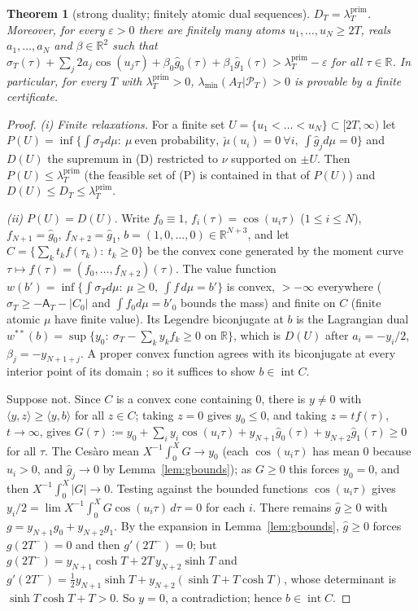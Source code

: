 \documentclass[11pt]{amsart}
\newtheorem{theorem}{Theorem}[section]
\theoremstyle{definition}
\theoremstyle{remark}
\newcommand{\R}{\mathbb R}
\newcommand{\PT}{\mathcal P_T}
\newcommand{\lamP}{\lambda^{\mathrm{prim}}_T}
\newcommand{\lamA}{\lambda_{\min}(A_T|\PT)}
\newcommand{\sT}{\sigma_T}
\newcommand{\gh}[1]{\widehat g_{#1}}
\newcommand{\Aconst}{\mathsf A_T}
\begin{document}
\begin{theorem}[strong duality; finitely atomic dual sequences]\label{thm:D1}
$D_T=\lamP$. Moreover, for every $\varepsilon>0$ there are finitely many atoms
$u_1,\dots,u_N\ge2T$, reals $a_1,\dots,a_N$ and $\beta\in\R^2$ such that
$\sT(\tau)+\sum_j2a_j\cos(u_j\tau)+\beta_0\gh0(\tau)+\beta_1\gh1(\tau)>\lamP-\varepsilon$ for all $\tau\in\R$.
In particular, for every $T$ with $\lamP>0$, $\lamA>0$ is provable by a finite certificate.
\end{theorem}
\begin{proof}
\emph{(i) Finite relaxations.} For a finite set $U=\{u_1<\dots<u_N\}\subset[2T,\infty)$ let
$P(U)=\inf\{\int\sT d\mu:\ \mu\ \text{even probability},\ \check\mu(u_i)=0\ \forall i,\ \int\gh j d\mu=0\}$
and $D(U)$ the supremum in (D) restricted to $\nu$ supported on $\pm U$. Then $P(U)\le\lamP$
(the feasible set of (P) is contained in that of $P(U)$) and $D(U)\le D_T\le\lamP$.

\emph{(ii) $P(U)=D(U)$.} Write $f_0\equiv1$, $f_i(\tau)=\cos(u_i\tau)$ ($1\le i\le N$),
$f_{N+1}=\gh0$, $f_{N+2}=\gh1$, $b=(1,0,\dots,0)\in\R^{N+3}$, and let
$C=\{\sum_kt_kf(\tau_k):\ t_k\ge0\}$ be the convex cone generated by the moment curve
$\tau\mapsto f(\tau)=(f_0,\dots,f_{N+2})(\tau)$. The value function
$w(b')=\inf\{\int\sT d\mu:\ \mu\ge0,\ \int f\,d\mu=b'\}$ is convex, $>-\infty$ everywhere
($\sT\ge-\Aconst-|C_0|$ and $\int f_0d\mu=b'_0$ bounds the mass) and finite on $C$ (finite atomic
$\mu$ have finite value). Its Legendre biconjugate at $b$ is the Lagrangian dual
$w^{**}(b)=\sup\{y_0:\ \sT-\sum_ky_kf_k\ge0\text{ on }\R\}$, which is $D(U)$ after
$a_i=-y_i/2$, $\beta_j=-y_{N+1+j}$. A proper convex function agrees with its biconjugate at every
interior point of its domain \cite[Thm.~7.4, Cor.~12.1.1]{Rockafellar}; so it suffices to show
$b\in\operatorname{int}C$.

Suppose not. Since $C$ is a convex cone containing $0$, there is $y\ne0$ with
$\langle y,z\rangle\ge\langle y,b\rangle$ for all $z\in C$; taking $z=0$ gives $y_0\le0$, and
taking $z=tf(\tau)$, $t\to\infty$, gives
$G(\tau):=y_0+\sum_iy_i\cos(u_i\tau)+y_{N+1}\gh0(\tau)+y_{N+2}\gh1(\tau)\ge0$ for all $\tau$.
The Ces\`aro mean $X^{-1}\int_0^XG\to y_0$ (each $\cos(u_i\tau)$ has mean $0$ because $u_i>0$,
and $\gh j\to0$ by Lemma~\ref{lem:gbounds}); as $G\ge0$ this forces $y_0=0$, and then
$X^{-1}\int_0^X|G|\to0$. Testing against the bounded functions $\cos(u_i\tau)$ gives
$y_i/2=\lim X^{-1}\int_0^XG\cos(u_i\tau)\,d\tau=0$ for each $i$. There remains
$\widehat g\ge0$ with $g=y_{N+1}g_0+y_{N+2}g_1$. By the expansion in Lemma~\ref{lem:gbounds},
$\widehat g\ge0$ forces $g(2T^-)=0$ and then $g'(2T^-)=0$; but
$g(2T^-)=y_{N+1}\cosh T+2T\,y_{N+2}\sinh T$ and $g'(2T^-)=\frac12y_{N+1}\sinh T+y_{N+2}(\sinh T+T\cosh T)$,
whose determinant is $\sinh T\cosh T+T>0$. So $y=0$, a contradiction; hence $b\in\operatorname{int}C$.


\end{proof}
\end{document}
